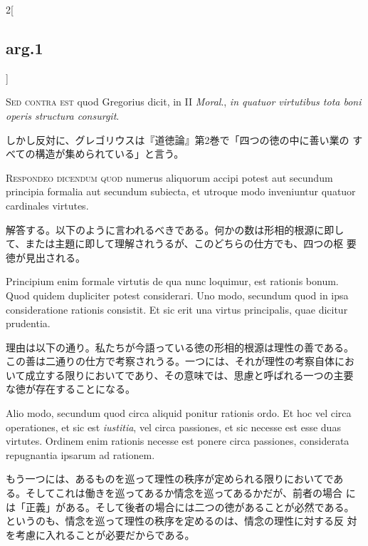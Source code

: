 \documentclass[paper=a4paper,fontsize=10pt,jafontsize=9pt,titlepage]{jlreq}
\begin{document}
\begin{paracol}{2}[\subsection{arg.1}]
\switchcolumn*[\subsection{s.c.}]

{\scshape Sed contra est} quod Gregorius dicit, in II {\itshape
Moral}., {\itshape in quatuor virtutibus tota boni operis structura
consurgit}.

\switchcolumn

しかし反対に、グレゴリウスは『道徳論』第2巻で「四つの徳の中に善い業の
 すべての構造が集められている」と言う。


{\scshape Respondeo dicendum quod} numerus aliquorum accipi potest
 aut secundum principia formalia aut secundum subiecta, et utroque
 modo inveniuntur quatuor cardinales virtutes.

\switchcolumn

解答する。以下のように言われるべきである。何かの数は形相的根源に即し
 て、または主題に即して理解されうるが、このどちらの仕方でも、四つの枢
 要徳が見出される。

\switchcolumn*

Principium enim formale virtutis de qua nunc loquimur, est rationis
 bonum.  Quod quidem dupliciter potest considerari. Uno modo, secundum
 quod in ipsa consideratione rationis consistit. Et sic erit una
 virtus principalis, quae dicitur prudentia.

\switchcolumn

理由は以下の通り。私たちが今語っている徳の形相的根源は理性の善である。
この善は二通りの仕方で考察されうる。一つには、それが理性の考察自体にお
いて成立する限りにおいてであり、その意味では、思慮と呼ばれる一つの主要
な徳が存在することになる。

\switchcolumn*

Alio modo, secundum quod circa aliquid ponitur rationis ordo. Et hoc
 vel circa operationes, et sic est {\itshape iustitia}, vel circa
 passiones, et sic necesse est esse duas virtutes. Ordinem enim
 rationis necesse est ponere circa passiones, considerata repugnantia
 ipsarum ad rationem.

\switchcolumn

もう一つには、あるものを巡って理性の秩序が定められる限りにおいてであ
 る。そしてこれは働きを巡ってあるか情念を巡ってあるかだが、前者の場合
 には「正義」がある。そして後者の場合には二つの徳があることが必然である。
 というのも、情念を巡って理性の秩序を定めるのは、情念の理性に対する反
 対を考慮に入れることが必要だからである。


\end{paracol}
\end{document}
